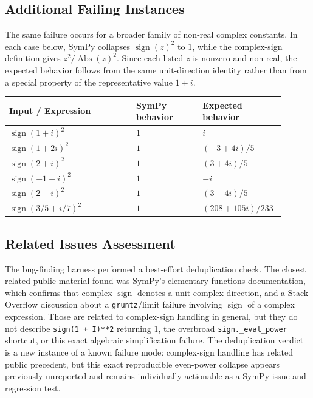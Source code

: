 \documentclass[11pt]{article}
\begin{document}
\subsection{Additional Failing Instances}

The same failure occurs for a broader family of non-real complex constants. In each case below, SymPy collapses \(\operatorname{sign}(z)^2\) to \(1\), while the complex-sign definition gives \(z^2/\operatorname{Abs}(z)^2\). Since each listed \(z\) is nonzero and non-real, the expected behavior follows from the same unit-direction identity rather than from a special property of the representative value \(1+i\).

\begin{center}
\renewcommand{\arraystretch}{1.3}
\begin{tabular}{@{}>{\raggedright\arraybackslash}p{0.44\linewidth}>{\raggedright\arraybackslash}p{0.23\linewidth}>{\raggedright\arraybackslash}p{0.23\linewidth}@{}}
\toprule
\textbf{Input / Expression} & \textbf{SymPy behavior} & \textbf{Expected behavior} \\
\midrule
\(\operatorname{sign}(1+i)^2\) & \(1\) & \(i\) \\
\(\operatorname{sign}(1+2i)^2\) & \(1\) & \((-3+4i)/5\) \\
\(\operatorname{sign}(2+i)^2\) & \(1\) & \((3+4i)/5\) \\
\(\operatorname{sign}(-1+i)^2\) & \(1\) & \(-i\) \\
\(\operatorname{sign}(2-i)^2\) & \(1\) & \((3-4i)/5\) \\
\(\operatorname{sign}(3/5+i/7)^2\) & \(1\) & \((208+105i)/233\) \\
\bottomrule
\end{tabular}
\end{center}

\subsection{Related Issues Assessment}

The bug-finding harness performed a best-effort deduplication check. The closest related public material found was SymPy's elementary-functions documentation, which confirms that complex \(\operatorname{sign}\) denotes a unit complex direction, and a Stack Overflow discussion about a \texttt{gruntz}/limit failure involving \(\operatorname{sign}\) of a complex expression. Those are related to complex-sign handling in general, but they do not describe \texttt{sign(1 + I)**2} returning \(1\), the overbroad \texttt{sign.\_eval\_power} shortcut, or this exact algebraic simplification failure. The deduplication verdict is a new instance of a known failure mode: complex-sign handling has related public precedent, but this exact reproducible even-power collapse appears previously unreported and remains individually actionable as a SymPy issue and regression test.
\end{document}
